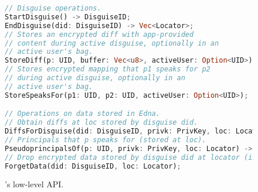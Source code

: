 \begin{figure}[t]
\begin{lstlisting}[language=Rust, style=rust]
// Disguise operations.
StartDisguise() -> DisguiseID;
EndDisguise(did: DisguiseID) -> Vec<Locator>;
// Stores an encrypted diff with app-provided
// content during active disguise, optionally in an
// active user's bag.
StoreDiff(p: UID, buffer: Vec<u8>, activeUser: Option<UID>);
// Stores encrypted mapping that p1 speaks for p2
// during active disguise, optionally in an 
// active user's bag.
StoreSpeaksFor(p1: UID, p2: UID, activeUser: Option<UID>);

// Operations on data stored in Edna.
// Obtain diffs at loc stored by disguise did.
DiffsForDisguise(did: DisguiseID, privk: PrivKey, loc: Locator) -> Vec<Vec<u8>>;
// Principals that p speaks for (stored at loc).
PseudoprincipalsOf(p: UID, privk: PrivKey, loc: Locator) -> Vec<UID>;
// Drop encrypted data stored by disguise did at locator (irreversible).
ForgetData(did: DisguiseID, loc: Locator);
\end{lstlisting}
\caption{\sys's low-level API.}
\label{f:api-low}
\end{figure}


